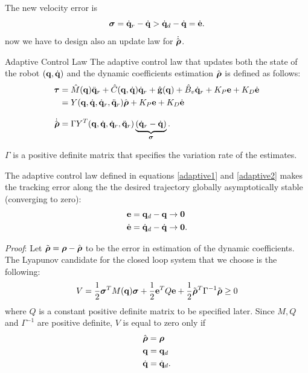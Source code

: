 \documentclass[10pt, a4paper]{report}
\newcommand{\q}{{\mathbf q}}
\begin{document}
\noindent The new velocity error is\begin{equation}
    \boldsymbol{\sigma}={\dot{\mathbf q}}_r-{\dot{\mathbf q}}>{\dot{\mathbf q}}_d-{\dot{\mathbf q}}={\dot{\mathbf e}}.
\end{equation}
now we have to design also an update law for $\dot{\hat {{\boldsymbol{\rho}}}}$.
\begin{boxdefinition}{Adaptive Control Law}{}
    The adaptive control law that updates both the state of the robot $(\q,\dq)$ and the dynamic coefficients estimation $\hat{{\boldsymbol{\rho}}}$ is defined as follows:\begin{align}
        \btau&=\hat M(\q)\ddq_r+\hat C(\q,\dq)\dq_r+\hat{\mathbf g}(\q)+\hat B_v\dq_r+K_P\mathbf e+K_D\de\\ 
        &=Y(\q,\dq,\dq_r,\ddq_r)\hat{\brho}+K_P\mathbf e+K_D\de\label{adaptive1}\\[2ex] 
        \dot{\hat\brho}&=\Gamma  Y^T(\q,\dq,\dq_r,\ddq_r)\underbrace{(\dq_r-\dq)}_{\boldsymbol{\sigma}}.\label{adaptive2}
    \end{align}
\end{boxdefinition}
\noindent$\Gamma$ is a positive definite matrix that specifies the variation rate of the estimates.
\begin{boxtheorem}{}{}
    The adaptive control law defined in equations \eqref{adaptive1} and \eqref{adaptive2} makes the tracking error along the the
desired trajectory globally asymptotically stable (converging to zero):\begin{align}
   & \mathbf e = \q_d-\q\rightarrow \mathbf 0\\
  &  \dot{\mathbf e} = \dq_d-\dq\rightarrow \mathbf 0.
\end{align}
\end{boxtheorem}
\noindent\textit{Proof}: Let $\tilde{{\boldsymbol{\rho}}}={\boldsymbol{\rho}}-\hat{{\boldsymbol{\rho}}}$ to be the error in estimation of the dynamic coefficients. The Lyapunov candidate for the closed loop system that we choose is the following:\begin{equation}
    V=\frac{1}{2}\boldsymbol{\sigma}^TM(\q)\boldsymbol{\sigma}+\frac{1}{2}\mathbf e^TQ\mathbf e+\frac{1}{2}\tilde\brho^T\Gamma^{-1}\tilde\brho\ge 0
\end{equation}
where $Q$ is a constant positive definite matrix to be specified later. Since $M,Q$ and $\Gamma^{-1}$ are positive definite, $V$ is equal to zero only if\begin{align}
    &\hat\brho=\brho\\ 
    &\q=\q_d \\ 
    &\dq=\dq_d.
\end{align}
\end{document}

